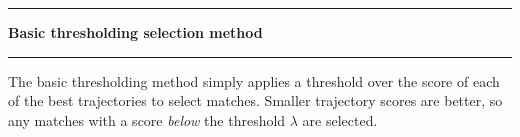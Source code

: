 \noindent\rule{\textwidth}{1pt}
\indent \textbf{Basic thresholding selection method}
\noindent\rule{\textwidth}{1pt}
\smallskip
\parbox{\textwidth}{The basic thresholding method simply applies a threshold over the score of each of the best trajectories to select matches. Smaller trajectory scores are better, so any matches with a score \textit{below} the threshold $\lambda$ are selected.}
\smallskip
